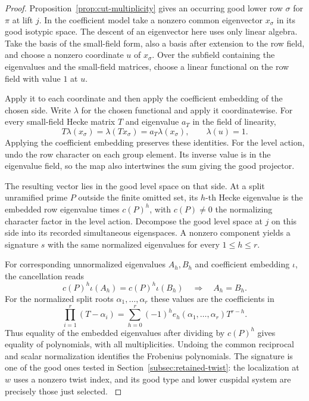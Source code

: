 \begin{proof}
Proposition~\ref{prop:cut-multiplicity} gives an occurring good
lower row \(\sigma\) for \(\pi\) at lift \(j\). In the coefficient model
take a nonzero common eigenvector \(x_\sigma\) in its good
isotypic space. The descent of an eigenvector here uses only
linear algebra. Take the basis of the small-field form, also a
basis after extension to the row field, and choose a nonzero
coordinate \(u\) of \(x_\sigma\). Over the subfield containing
the eigenvalues and the small-field matrices, choose a linear
functional on the row field with value \(1\) at \(u\).

Apply it
to each coordinate and then apply the coefficient embedding of
the chosen side. Write \(\lambda\) for the chosen functional and apply it coordinatewise. For every small-field Hecke matrix \(T\) and eigenvalue \(a_T\) in the field of linearity,
\[
 T\lambda(x_\sigma)=\lambda(Tx_\sigma)=a_T\lambda(x_\sigma),\qquad \lambda(u)=1.
\]
Applying the coefficient embedding preserves these identities. For the level action, undo the row character on each
group element. Its inverse value is in the eigenvalue field,
so the map also intertwines the sum giving the good projector.

The resulting vector lies in the good level space on that side.
At a split unramified prime \(P\) outside the finite omitted set,
its \(h\)-th Hecke eigenvalue is the embedded row eigenvalue
times \(c(P)^h\), with \(c(P)\ne0\) the normalizing character
factor in the level action. Decompose the good level space at \(j\) on this side into its recorded simultaneous eigenspaces. A nonzero component yields a signature \(s\) with the same normalized eigenvalues for every \(1\le h\le r\).

For corresponding unnormalized eigenvalues \(A_h,B_h\) and coefficient embedding \(\iota\), the cancellation reads
\[
 c(P)^h\iota(A_h)=c(P)^h\iota(B_h)\quad\Longrightarrow\quad A_h=B_h.
\]
For the normalized split roots \(\alpha_1,\ldots,\alpha_r\)
these values are the coefficients in
\[
 \prod_{i=1}^r (T-\alpha_i)
     =\sum_{h=0}^r(-1)^h e_h(\alpha_1,\ldots,\alpha_r) T^{r-h}.
\]
Thus equality of the embedded eigenvalues after dividing by
\(c(P)^h\) gives equality of polynomials, with all multiplicities. Undoing the common reciprocal and
scalar normalization identifies the Frobenius polynomials.
The signature is one of the good ones tested in
Section~\ref{subsec:retained-twist}: the localization at \(w\)
uses a nonzero twist index, and its good type and lower
cuspidal system are precisely those just selected.
\label{cor:marked-localization-1}


\end{proof}
